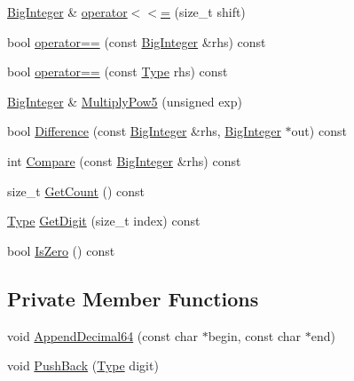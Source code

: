 \begin{DoxyCompactItemize}
\mbox{\hyperlink{classrapidjson_1_1internal_1_1_big_integer}{Big\+Integer}} \& \mbox{\hyperlink{classrapidjson_1_1internal_1_1_big_integer_a40e01848b5849e12f7bb89c9939c877e}{operator$<$$<$=}} (size\+\_\+t shift)
\item 
bool \mbox{\hyperlink{classrapidjson_1_1internal_1_1_big_integer_af8a7061cd878d855c22a80dd48a44b15}{operator==}} (const \mbox{\hyperlink{classrapidjson_1_1internal_1_1_big_integer}{Big\+Integer}} \&rhs) const
\item 
bool \mbox{\hyperlink{classrapidjson_1_1internal_1_1_big_integer_afcc8c8b661e70648683f11c4211df380}{operator==}} (const \mbox{\hyperlink{classrapidjson_1_1internal_1_1_big_integer_a37d8e8c111f0d76fa07bb4da4790514d}{Type}} rhs) const
\item 
\mbox{\hyperlink{classrapidjson_1_1internal_1_1_big_integer}{Big\+Integer}} \& \mbox{\hyperlink{classrapidjson_1_1internal_1_1_big_integer_a60c5fbdcd9992177d25bda441e5d49bb}{Multiply\+Pow5}} (unsigned exp)
\item 
bool \mbox{\hyperlink{classrapidjson_1_1internal_1_1_big_integer_a23baf787c5ab4a2992bed7f7e260ed9e}{Difference}} (const \mbox{\hyperlink{classrapidjson_1_1internal_1_1_big_integer}{Big\+Integer}} \&rhs, \mbox{\hyperlink{classrapidjson_1_1internal_1_1_big_integer}{Big\+Integer}} $\ast$out) const
\item 
int \mbox{\hyperlink{classrapidjson_1_1internal_1_1_big_integer_a4fe28d5e962cd9ad471536508ce47fdb}{Compare}} (const \mbox{\hyperlink{classrapidjson_1_1internal_1_1_big_integer}{Big\+Integer}} \&rhs) const
\item 
size\+\_\+t \mbox{\hyperlink{classrapidjson_1_1internal_1_1_big_integer_a2eabd50da3448f21c61cc0ba487a4b17}{Get\+Count}} () const
\item 
\mbox{\hyperlink{classrapidjson_1_1internal_1_1_big_integer_a37d8e8c111f0d76fa07bb4da4790514d}{Type}} \mbox{\hyperlink{classrapidjson_1_1internal_1_1_big_integer_af6712b16f2f289ab2b37b7c712baf557}{Get\+Digit}} (size\+\_\+t index) const
\item 
bool \mbox{\hyperlink{classrapidjson_1_1internal_1_1_big_integer_a5db6206954723ed86afaf937a3b9dd5c}{Is\+Zero}} () const
\end{DoxyCompactItemize}
\subsection*{Private Member Functions}
\begin{DoxyCompactItemize}
\item 
void \mbox{\hyperlink{classrapidjson_1_1internal_1_1_big_integer_ae57bd085399181c535bdc25798d77542}{Append\+Decimal64}} (const char $\ast$begin, const char $\ast$end)
\item 
void \mbox{\hyperlink{classrapidjson_1_1internal_1_1_big_integer_a2dc125d5ff140b3f63de36e59e223d93}{Push\+Back}} (\mbox{\hyperlink{classrapidjson_1_1internal_1_1_big_integer_a37d8e8c111f0d76fa07bb4da4790514d}{Type}} digit)
\end{DoxyCompactItemize}
